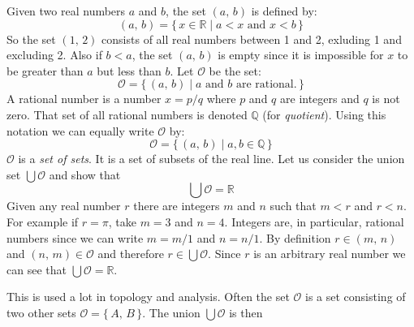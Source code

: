            \begin{example}
                Given two real numbers $a$ and $b$, the set $(a,\,b)$ is defined
                by:
                \begin{equation}
                    (a,\,b)=\{\,x\in\mathbb{R}\;|\;a<x\textrm{ and }x<b\,\}
                \end{equation}
                So the set $(1,\,2)$ consists of all real numbers between 1 and
                2, exluding 1 and excluding 2. Also if $b<a$, the set
                $(a,\,b)$ is empty since it is impossible for
                $x$ to be greater than $a$ but less than $b$.
                Let $\mathcal{O}$ be the set:
                \begin{equation}
                    \mathcal{O}=\{\,(a,\,b)\;|\;
                        a\textrm{ and }b\textrm{ are rational.}\,\}
                \end{equation}
                A rational number is a number $x=p/q$ where $p$ and $q$ are
                integers and $q$ is not zero. That set of all rational numbers
                is denoted $\mathbb{Q}$ (for \textit{quotient}). Using this
                notation we can equally write $\mathcal{O}$ by:
                \begin{equation}
                    \mathcal{O}=\{\,(a,\,b)\;|\;a,b\in\mathbb{Q}\,\}
                \end{equation}
                $\mathcal{O}$ is a \textit{set of sets}. It is a set of subsets
                of the real line. Let us consider the union set
                $\bigcup\mathcal{O}$ and show that
                \begin{equation}
                    \bigcup\mathcal{O}=\mathbb{R}
                \end{equation}
                Given any real number $r$ there are integers $m$ and $n$
                such that $m<r$ and $r<n$. For example if $r=\pi$, take
                $m=3$ and $n=4$. Integers are, in particular, rational numbers
                since we can write $m=m/1$ and $n=n/1$. By definition
                $r\in(m,\,n)$ and $(n,\,m)\in\mathcal{O}$ and therefore
                $r\in\bigcup\mathcal{O}$. Since $r$ is an arbitrary real number
                we can see that $\bigcup\mathcal{O}=\mathbb{R}$.
            \end{example}
            This is used a lot in topology and analysis. Often the set
            $\mathcal{O}$ is a set consisting of two other sets
            $\mathcal{O}=\{\,A,\,B\,\}$. The union $\bigcup\mathcal{O}$ is then
